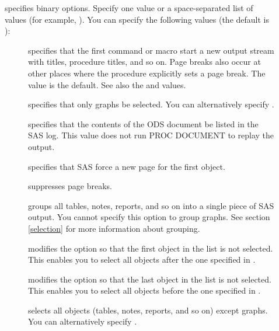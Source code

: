 \documentclass[article,oneside]{memoir}
\begin{document}
\begin{description}
  \item[] specifies binary options.  Specify one value or a space-separated
  list of values (for example, ).
  You can specify the following values (the default is ):

  \begin{description}
  \item[] specifies that the first 
  command or  macro start a new output stream with
  titles, procedure titles, and so on.
  Page breaks also occur at other places where the procedure
  explicitly sets a page break. The  value is the default.
  See also the  and  values.

 \item[] specifies that only graphs be selected.
  You can alternatively specify .

  \item[] specifies that the contents of the ODS document be listed
  in the SAS log. This value does not run PROC DOCUMENT to replay the output.

  \item[] specifies that SAS force a new page for the first object.

  \item[] suppresses page breaks.

  \item[] groups all tables, notes, reports, and so on into a
  single piece of SAS output. You cannot specify this option to group graphs.
  See section \ref{selection} for more information about grouping.

  \item[] modifies the  option so that the first object in the
  list is not selected. This enables you to select all objects after the one
  specified in .

  \item[] modifies the  option so that the last object
  in the list is not selected. This enables you to select all objects before
  the one specified in .\label{skiplast}

  \item[] selects all objects
  (tables, notes, reports, and so on) except graphs. You can
  alternatively specify .


\end{description}
\end{description}
\end{document}
